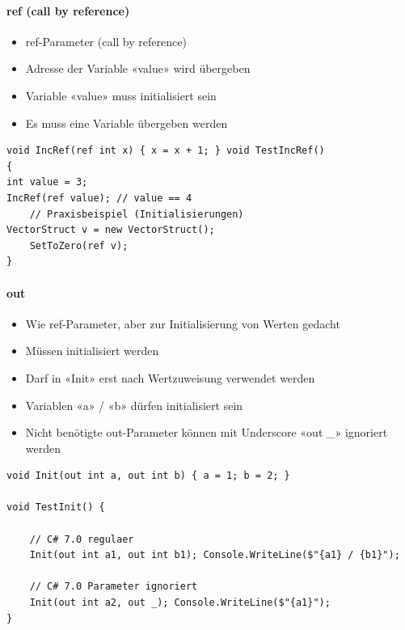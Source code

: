 \paragraph{ref (call by reference)}
\begin{itemize}
    \item ref-Parameter (call by reference)
    \item Adresse der Variable «value» wird übergeben
    \item Variable «value» muss initialisiert sein
    \item Es muss eine Variable übergeben werden
\end{itemize}
\begin{lstlisting}
void IncRef(ref int x) { x = x + 1; } void TestIncRef()
{
int value = 3;
IncRef(ref value); // value == 4
    // Praxisbeispiel (Initialisierungen)
VectorStruct v = new VectorStruct();
    SetToZero(ref v);
}
\end{lstlisting}


\paragraph{out}
\begin{itemize}
    \item Wie ref-Parameter, aber zur Initialisierung von Werten gedacht
    \item Müssen initialisiert werden
    \item Darf in «Init» erst nach Wertzuweisung verwendet werden
    \item Variablen «a» / «b» dürfen initialisiert sein
    \item Nicht benötigte out-Parameter können mit Underscore «out \_» ignoriert werden
\end{itemize}


\begin{lstlisting}
void Init(out int a, out int b) { a = 1; b = 2; }

void TestInit() {

    // C# 7.0 regulaer
    Init(out int a1, out int b1); Console.WriteLine($"{a1} / {b1}");

    // C# 7.0 Parameter ignoriert
    Init(out int a2, out _); Console.WriteLine($"{a1}");
}
\end{lstlisting}

